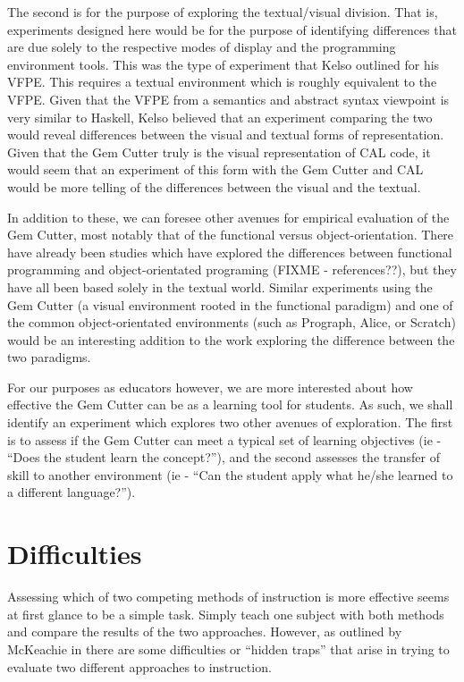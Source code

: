 The second is for the purpose of exploring the textual/visual division.  That is, experiments designed here would be for the purpose of identifying differences that are due solely to the respective modes of display and the programming environment tools.  This was the type of experiment that Kelso outlined for his VFPE.  This requires a textual environment which is roughly equivalent to the VFPE.  
Given that the VFPE from a semantics and abstract syntax viewpoint is very similar to Haskell, Kelso believed that an experiment comparing the two would reveal differences between the visual and textual forms of representation.  Given that the Gem Cutter truly is the visual representation of CAL code, it would seem that an experiment of this form with the Gem Cutter and CAL would be more telling of the differences between the visual and the textual.

In addition to these, we can foresee other avenues for empirical evaluation of the Gem Cutter, most notably that of the functional versus object-orientation.  There have already been studies which have explored the differences between functional programming and object-orientated programing (FIXME - references??), but they have all been based solely in the textual world.  Similar experiments using the Gem Cutter (a visual environment rooted in the functional paradigm) and one of the common object-orientated environments (such as Prograph, Alice, or Scratch) would be an interesting addition to the work exploring the difference between the two paradigms.

For our purposes as educators however, we are more interested about how effective the Gem Cutter can be as a learning tool for students.  As such, we shall identify an experiment which explores two other avenues of exploration.  The first is to assess if the Gem Cutter can meet a typical set of learning objectives (ie - ``Does the student learn the concept?''), and the second assesses the transfer of skill to another environment (ie - ``Can the student apply what he/she learned to a different language?'').

\section{Difficulties}

Assessing which of two competing methods of instruction is more effective seems at first glance to be a simple task.  Simply teach one subject with both methods and compare the results of the two approaches.  However, as outlined by McKeachie in \cite{teachingTips} there are some difficulties or ``hidden traps'' that arise in trying to evaluate two different approaches to instruction.

